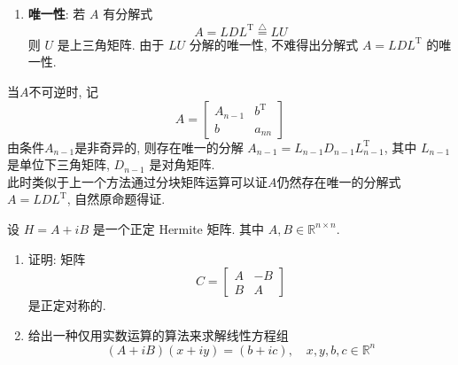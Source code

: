 \documentclass[12pt, answers]{exam}     %
\newcommand{\T}{\mathrm{T}}
\begin{document}
\begin{questions}
\begin{solution}
\begin{enumerate}
    \item \textbf{唯一性}: 
    若 \( A \) 有分解式
    \[
    A = LDL^{\T} \overset{\triangle}{=} LU
    \]
    则 \( U \) 是上三角矩阵. 由于 \( LU \) 分解的唯一性, 不难得出分解式 \( A = LDL^{\T} \) 的唯一性. 
\end{enumerate}
当$A$不可逆时, 记
\[
A = \begin{bmatrix}
    A_{n-1} & b^{\T} \\
    b & a_{nn}
\end{bmatrix}
\] 
由条件$A_{n-1}$是非奇异的, 则存在唯一的分解 $A_{n-1} = L_{n-1} D_{n-1} L_{n-1}^{\T}$, 其中 $L_{n-1}$ 是单位下三角矩阵, $D_{n-1}$ 是对角矩阵. \\
此时类似于上一个方法通过分块矩阵运算可以证$A$仍然存在唯一的分解式$A=LDL^{\T}$, 自然原命题得证.
\end{solution}

\question{}
设 \( H = A + iB \) 是一个正定 Hermite 矩阵. 其中 \( A, B \in \mathbb{R}^{n \times n} \).
\begin{enumerate}[label=(\arabic*)]
\item 证明: 矩阵
\[
C =
\begin{bmatrix}
A & -B \\
B & A
\end{bmatrix}
\]
是正定对称的.

\item 给出一种仅用实数运算的算法来求解线性方程组
\[
(A + iB)(x + iy) = (b + ic), \quad x, y, b, c \in \mathbb{R}^n
\]
\end{enumerate}


\end{questions}
\end{document}
